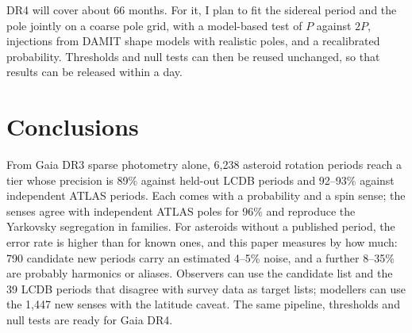 DR4 will cover about 66 months. For it, I plan to fit the sidereal period and the pole jointly on a coarse
pole grid, with a model-based test of $P$ against $2P$, injections from DAMIT shape models with realistic
poles, and a recalibrated probability. Thresholds and null tests can then be reused unchanged, so that
results can be released within a day.

\section{Conclusions}

From Gaia DR3 sparse photometry alone, 6{,}238 asteroid rotation periods reach a tier whose precision is
89\% against held-out LCDB periods and 92--93\% against independent ATLAS periods. Each comes with a
probability and a spin sense; the senses agree with independent ATLAS poles for 96\% and reproduce the
Yarkovsky segregation in families. For asteroids without a published period, the error rate is higher than
for known ones, and this paper measures by how much: 790 candidate new periods carry an estimated 4--5\%
noise, and a further 8--35\% are probably harmonics or aliases. Observers can use the candidate list and the 39
LCDB periods that disagree with survey data as target lists; modellers can use the 1{,}447 new senses with the
latitude caveat. The same pipeline, thresholds and null tests are ready for Gaia DR4.
